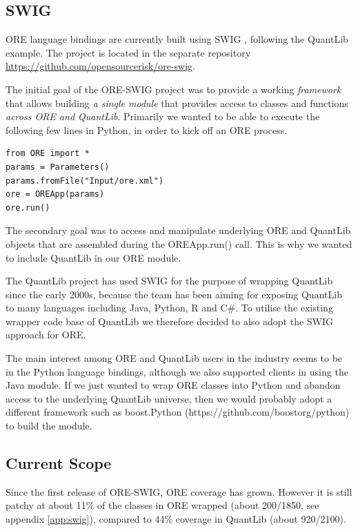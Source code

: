 \documentclass[12pt, a4paper]{report}
\begin{document}
\subsection*{SWIG}

ORE language bindings are currently built using SWIG \cite{swig}, following the QuantLib example. 
The project is located in the separate repository \url{https://github.com/opensourcerisk/ore-swig}.

The initial goal of the ORE-SWIG project was to provide a working {\em framework} that allows building
{\em a single module} that provides access to classes and functions {\em across ORE and QuantLib}.
Primarily we wanted to be able to execute the following few lines in Python, in order to kick
off an ORE process.

\begin{verbatim}
from ORE import *
params = Parameters()
params.fromFile("Input/ore.xml")
ore = OREApp(params)
ore.run()
\end{verbatim}

The secondary goal was to access and manipulate underlying ORE and QuantLib objects that are assembled
during the OREApp.run() call. This is why we wanted to include QuantLib in our ORE module.

The QuantLib project has used SWIG for the purpose of wrapping QuantLib since the early 2000s,
because the team has been aiming for exposing QuantLib to many languages including Java, Python,
R and C\#. To utilise the existing wrapper code base of QuantLib we therefore decided to also adopt
the SWIG approach for ORE.

The main interest among ORE and QuantLib users in the industry seems to be in the Python
language bindings, although we also supported clients in using the Java module.
If we just wanted to wrap ORE classes into Python and abandon access to the underlying
QuantLib universe, then we would probably adopt a different framework such as boost.Python
(https://github.com/boostorg/python) to build the module.

\subsection*{Current Scope}

Since the first release of ORE-SWIG, ORE coverage has grown. However it is still patchy  
at about 11\% of the classes in ORE wrapped (about 200/1850, see appendix \ref{app:swig}),
compared to 44\% coverage in QuantLib (about 920/2100). 
\end{document}
